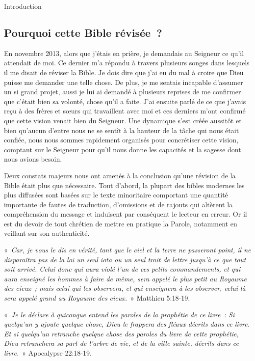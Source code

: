 \begin{center}{\LARGE Introduction}\end{center}
\begin{small}
\subsection*{Pourquoi cette Bible révisée~?}

En novembre 2013, alors que j'étais en prière, je demandais au Seigneur ce qu'il attendait de moi. Ce dernier m'a répondu à travers plusieurs songes dans lesquels il me disait de réviser la Bible. Je dois dire que j'ai eu du mal à croire que Dieu puisse me demander une telle chose. De plus, je me sentais incapable d'assumer un si grand projet, aussi je lui ai demandé à plusieurs reprises de me confirmer que c'était bien sa volonté, chose qu'il a faite. J'ai ensuite parlé de ce que j'avais reçu à des frères et sœurs qui travaillent avec moi et ces derniers m'ont confirmé que cette vision venait bien du Seigneur. Une dynamique s'est créée aussitôt et bien qu'aucun d'entre nous ne se sentît à la hauteur de la tâche qui nous était confiée, nous nous sommes rapidement organisés pour concrétiser cette vision, comptant sur le Seigneur pour qu'il nous donne les capacités et la sagesse dont nous avions besoin.\bigskip

Deux constats majeurs nous ont amenés à la conclusion qu'une révision de la Bible était plus que nécessaire. Tout d'abord, la plupart des bibles modernes les plus diffusées sont basées sur le texte minoritaire comportant une quantité importante de fautes de traduction, d'omissions et de rajouts qui altèrent la compréhension du message et induisent par conséquent le lecteur en erreur. Or il est du devoir de tout chrétien de mettre en pratique la Parole, notamment en veillant sur son authenticité.\bigskip

«~\emph{Car, je vous le dis en vérité, tant que le ciel et la terre ne passeront point, il ne disparaîtra pas de la loi un seul iota ou un seul trait de lettre jusqu'à ce que tout soit arrivé. Celui donc qui aura violé l'un de ces petits commandements, et qui aura enseigné les hommes à faire de même, sera appelé le plus petit au Royaume des cieux~; mais celui qui les observera, et qui enseignera à les observer, celui-là sera appelé grand au Royaume des cieux.}~» Matthieu 5:18-19.\bigskip

«~\emph{Je le déclare à quiconque entend les paroles de la prophétie de ce livre~: Si quelqu'un y ajoute quelque chose, Dieu le frappera des fléaux décrits dans ce livre. Et si quelqu'un retranche quelque chose des paroles du livre de cette prophétie, Dieu retranchera sa part de l'arbre de vie, et de la ville sainte, décrits dans ce livre.}~» Apocalypse 22:18-19.\bigskip


\end{small}
